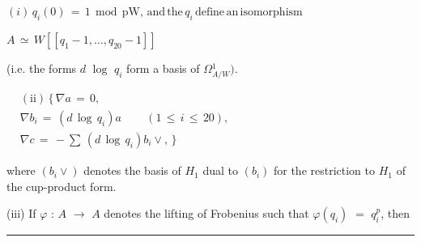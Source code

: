 \documentclass[9pt]{article}
\newcommand{\CanonText}[1]{\par{\fontsize{8.0}{9.35}\selectfont\RaggedRight #1\par}\vspace{2.2pt}}
\newcommand{\CanonDisplay}[1]{\par\vspace{1.2pt}\begin{center}{\fontsize{7.2}{8.4}\selectfont\(\displaystyle #1\)}\end{center}\vspace{1.2pt}}
\newenvironment{CanonMathBlock}{\par\vspace{1.2pt}\begin{center}\fontsize{6.8}{8.0}\selectfont\(\displaystyle}{\)\end{center}\vspace{1.2pt}}
\begin{document}
\begin{minipage}[t][\dimexpr\textheight-5pt\relax][t]{\textwidth}
\CanonDisplay{(i)\,q_{i}(0)\,=\,1\,\operatorname{mod}\,\text{pW},\,\text{and}\,\text{the}\,q_{i}\,\text{define}\,\text{an}\,\text{isomorphism}}
\CanonDisplay{A\,\simeq{}\,W[[q_{1}-1,\ldots{},q_{20}-1]]}
\CanonText{(i.e. the forms \(d\) \(\operatorname{log}\) \(q_{i}\) form a basis of \(\Omega{}^{1}_{A/W})\).}
\begin{CanonMathBlock}
\begin{aligned}
& (\text{ii})\,\lbrace{}\,\nabla{}a\,=\,0,\\
& \nabla{}b_{i}\,=\,(d\,\operatorname{log}\,q_{i})a\qquad\,(1\,\leq{}\,i\,\leq{}\,20),\\
& \nabla{}c\,=\,-\sum{}\,(d\,\operatorname{log}\,q_{i})b_{i}\vee{},\,\rbrace{}
\end{aligned}
\end{CanonMathBlock}
\CanonText{where \((b_{i}\vee{})\) denotes the basis of \(H_{1}\) dual to \((b_{i})\) for the restriction to \(H_{1}\) of the cup-product form.}
\CanonText{(iii) If \(\varphi{}\) : \(A\) \(\to{}\) \(A\) denotes the lifting of Frobenius such that \(\varphi{}(q_{i})\) \(=\) \(q_{i}^{p}\), then}
\vfill
{\color{Accent}\hrule height 0.35pt}\vspace{3pt}
\end{minipage}
\newpage
\end{document}
